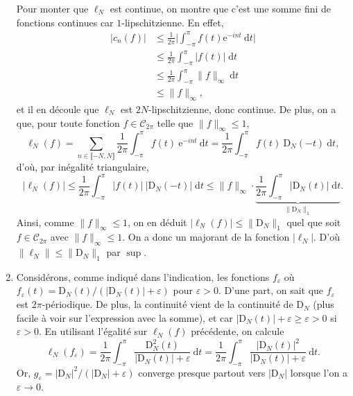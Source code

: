 \documentclass{../../td}
\begin{document}
\begin{enumerate}
      Pour monter que $\ell_N$ est continue, on montre que c'est une somme fini de fonctions continues car $1$-lipschitzienne.
      En effet,
      \begin{align*}
        |c_n(f)| &\le  \frac{1}{2\pi} \Big|\int_{-\pi}^\pi f(t) \mathrm{e}^{-int}\: \mathrm{d}t\Big|\\
                 &\le \frac{1}{2\pi} \int_{-\pi}^\pi |f(t)|\; \mathrm{d}t\\
                 &\le \frac{1}{2\pi} \int_{-\pi}^\pi \|f\|_{\infty}\: \mathrm{d}t\\
                 &\le \|f\|_{\infty}
      ,\end{align*}
      et il en découle que $\ell_N$ est $2N$-lipschitzienne, donc continue.
      De plus, on a que, pour toute fonction $f \in \mathcal{C}_{2\pi}$ telle que $\|f\|_{\infty} \le 1$, \[
      \ell_N(f) = \sum_{n \in \llbracket -N,N\rrbracket} \frac{1}{2\pi} \int_{-\pi}^\pi f(t)\: \mathrm{e}^{-int}\: \mathrm{d}t = \frac{1}{2\pi} \int_{-\pi}^\pi f(t) \: \mathrm{D}_N(-t)\: \mathrm{d}t
      ,\] 
      d'où, par inégalité triangulaire, \[
        |\ell_N(f)| \le \frac{1}{2\pi} \int_{-\pi}^\pi |f(t)|\: |\mathrm{D}_N(-t)|\; \mathrm{d}t \le \|f\|_\infty \cdot \underbrace{\frac{1}{2\pi} \int_{-\pi}^\pi |\mathrm{D}_N(t)|\; \mathrm{d}t}_{\|\mathrm{D}_N\|_1}
      .\]
      Ainsi, comme $\|f\|_{\infty} \le 1$, on en déduit $|\ell_N(f)| \le \|\mathrm{D}_N\|_1$ quel que soit $f \in \mathcal{C}_{2\pi}$ avec $\|f\|_{\infty} \le 1$. On a donc un majorant de la fonction $|\ell_N|$.
      D'où $\|\ell_N\| \le \|\mathrm{D}_N\|_1$ par $\sup$.
    \item Considérons, comme indiqué dans l'indication, les fonctions $f_\varepsilon$ où  $f_\varepsilon(t) = \mathrm{D}_N(t) / (|\mathrm{D}_N(t)| + \varepsilon)$ pour $\varepsilon > 0$.
      D'une part, on sait que $f_{\varepsilon}$ est $2\pi$-périodique.
      De plus, la continuité vient de la continuité de $\mathrm{D}_N$ (plus facile à voir sur l'expression avec la somme), et car $|\mathrm{D}_N(t)| + \varepsilon \ge \varepsilon > 0$ si $\varepsilon > 0$.
      En utilisant l'égalité sur $\ell_N(f)$ précédente, on calcule \[
        \ell_N(f_{\varepsilon}) = \frac{1}{2\pi} \int_{-\pi}^\pi \frac{\mathrm{D}_N^2(t)}{|\mathrm{D}_N(t)| + \varepsilon}\: \mathrm{d}t = \frac{1}{2\pi} \int_{-\pi}^\pi \frac{|\mathrm{D}_N(t)|^2}{|\mathrm{D}_N(t)| + \varepsilon}\: \mathrm{d}t
      .\]
      Or, $g_{\varepsilon} = |\mathrm{D}_N|^2 / (|\mathrm{D}_N| + \varepsilon)$ converge presque partout vers $|\mathrm{D}_N|$ lorsque l'on a $\varepsilon \to 0$.

\end{enumerate}
\end{document}
